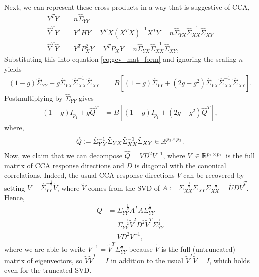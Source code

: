 \documentclass{article}
\begin{document}
Next, we can represent these cross-products in a way that is suggestive of CCA,
\begin{align*}
  Y^{T}Y &= n \hat{\Sigma}_{YY} \\
  \hat{Y}^{T}Y &= Y^{T}HY = Y^{T}X\left(X^{T}X\right)^{-1}X^{T}Y =
  n\hat{\Sigma}_{YX}\hat{\Sigma}_{XX}^{-1} \hat{\Sigma}_{XY} \\
  \hat{Y}^{T}\hat{Y} &= Y^{T}P_{X}^2 Y = Y^{T}P_{X}Y=
  n\hat{\Sigma}_{YX}\hat{\Sigma}_{XX}^{-1} \hat{\Sigma}_{XY},
\end{align*}
Substituting this into equation \ref{eq:gcv_mat_form} and ignoring the scaling
$n$ yields
\begin{align*}
\left(1 - g\right)\hat{\Sigma}_{YY} + g
\hat{\Sigma}_{YX}\hat{\Sigma}_{XX}^{-1}\hat{\Sigma}_{XY} &=
B\left[\left(1 - g\right)\hat{\Sigma}_{YY} + \left(2g -
    g^{2}\right)\hat{\Sigma}_{YX}\hat{\Sigma}_{XX}^{-1}\hat{\Sigma}_{XY}\right].
\end{align*}
Postmultiplying by $\hat{\Sigma}_{YY}$ gives
\begin{align}
  \left(1 - g\right)I_{p_{1}} + g\hat{Q}^{T} &= B\left[\left(1 -
      g\right)I_{p_{1}} + \left(2g -
      g^{2}\right)\hat{Q}^{T}\right], \label{eq:cca_gcv_id}
\end{align}
where,
\begin{align*}
\hat{Q} :=
\hat{\Sigma}_{YY}^{-1}\hat{\Sigma}_{YX}\hat{\Sigma}_{XX}^{-1}\hat{\Sigma}_{XY}
\in \mathbb{R}^{p_{1}\times p_{1}}.
\end{align*}
Now, we claim that we can decompose $\hat{Q} = VD^{2}V^{-1}$, where $V \in
\mathbb{R}^{p_{1} \times p_{1}}$ is the full matrix of CCA response directions and
$D$ is diagonal with the canonical correlations. Indeed, the usual CCA response
directions $V$ can be recovered by setting $V =
\hat{\Sigma}_{YY}^{-\frac{1}{2}}\tilde{V}$, where $\tilde{V}$ comes from the SVD
of $A := \Sigma_{XX}^{-\frac{1}{2}}\Sigma_{XY}\Sigma_{XX}^{-\frac{1}{2}} =
\tilde{U}D\tilde{V}^{T}$. Hence,
\begin{align*}
  Q &= \Sigma_{YY}^{-\frac{1}{2}}A^{T}A\Sigma_{YY}^{\frac{1}{2}} \\
  &= \Sigma_{YY}^{-\frac{1}{2}}\tilde{V}^{2}D^{2}\tilde{V}^{T}\Sigma_{YY}^{\frac{1}{2}}\\
  &= VD^{2}V^{-1},
\end{align*}
where we are able to write $V^{-1} = \tilde{V}^{T}\Sigma_{YY}^{\frac{1}{2}}$
because $\tilde{V}$ is the full (untruncated) matrix of eigenvectors, so
$\tilde{V}\tilde{V}^{T} = I$ in addition to the usual $\tilde{V}^{T}\tilde{V}
=I$, which holds even for the truncated SVD.
\end{document}
